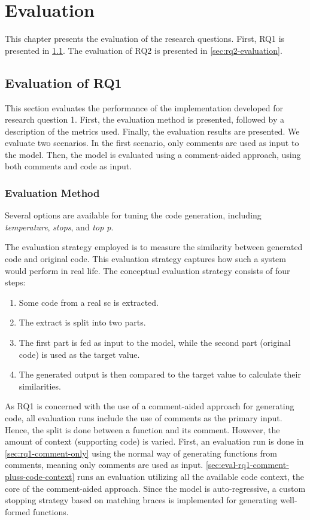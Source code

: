 
\chapter{Evaluation}
\label{chap:evaluation}
This chapter presents the evaluation of the research questions. First, RQ1 is presented in \cref{sec:rq1-evaluation}. The evaluation of RQ2 is presented in \cref{sec:rq2-evaluation}.

\section{Evaluation of RQ1}
\label{sec:rq1-evaluation}
This section evaluates the performance of the implementation developed for research question 1. First, the evaluation method is presented, followed by a description of the metrics used. Finally, the evaluation results are presented.  We evaluate two scenarios. In the first scenario, only comments are used as input to the model. Then, the model is evaluated using a comment-aided approach, using both comments and code as input.

\subsection{Evaluation Method}
\label{sec:rq1-evaluation-method}

Several options are available for tuning the code generation, including \textit{temperature}, \textit{stops}, and \textit{top p}.

The evaluation strategy employed is to measure the similarity between generated code and original code. This evaluation strategy captures how such a system would perform in real life. The conceptual evaluation strategy consists of four steps:
\begin{enumerate}
    \item Some code from a real \acrshort{sc} is extracted.
    \item The extract is split into two parts.
    \item The first part is fed as input to the model, while the second part (original code) is used as the target value.
    \item The generated output is then compared to the target value to calculate their similarities.
\end{enumerate}

As RQ1 is concerned with the use of a comment-aided approach for generating code, all evaluation runs include the use of comments as the primary input. Hence, the split is done between a function and its comment. However, the amount of context (supporting code) is varied. First, an evaluation run is done in \cref{sec:rq1-comment-only} using the normal way of generating functions from comments, meaning only comments are used as input. \cref{sec:eval-rq1-comment-pluss-code-context} runs an evaluation utilizing all the available code context, the core of the comment-aided approach. Since the model is auto-regressive, a custom stopping strategy based on matching braces is implemented for generating well-formed functions.

